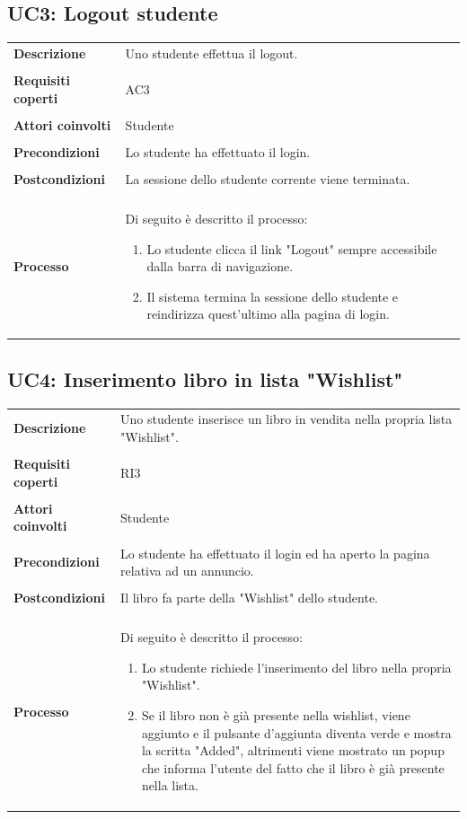 \documentclass[10pt,a4paper]{article}
\begin{document}
	\subsection{UC3: Logout studente}
	\begin{tabular}{lp{}}
		\textbf{Descrizione}&Uno studente effettua il logout.\\
		\\
		\textbf{Requisiti coperti}&AC3\\
		\\
		\textbf{Attori coinvolti}&Studente\\
		\\
		\textbf{Precondizioni}&Lo studente ha effettuato il login.\\
		\\
		\textbf{Postcondizioni}&La sessione dello studente corrente viene terminata.\\
		\\
		\textbf{Processo}&Di seguito è descritto il processo:
		\begin{enumerate}
			\item Lo studente clicca il link "Logout" sempre accessibile dalla barra di navigazione.
			\item Il sistema termina la sessione dello studente e reindirizza quest'ultimo alla pagina di login.
		\end{enumerate}
	\end{tabular}

	\subsection{UC4: Inserimento libro in lista "Wishlist"}
	\begin{tabular}{lp{}}
		\textbf{Descrizione}&Uno studente inserisce un libro in vendita nella propria lista "Wishlist".\\
		\\
		\textbf{Requisiti coperti}&RI3\\
		\\
		\textbf{Attori coinvolti}&Studente\\
		\\
		\textbf{Precondizioni}&Lo studente ha effettuato il login ed ha aperto la pagina relativa ad un annuncio.\\
		\\
		\textbf{Postcondizioni}&Il libro fa parte della "Wishlist" dello studente.\\
		\\
		\textbf{Processo}&Di seguito è descritto il processo:
		\begin{enumerate}
			\item Lo studente richiede l'inserimento del libro nella propria "Wishlist".
			\item Se il libro non è già presente nella wishlist, viene aggiunto e il pulsante d'aggiunta diventa verde e mostra la scritta "Added", altrimenti viene mostrato un popup che informa l'utente del fatto che il libro è già presente nella lista.
		\end{enumerate}
	\end{tabular}
\end{document}
